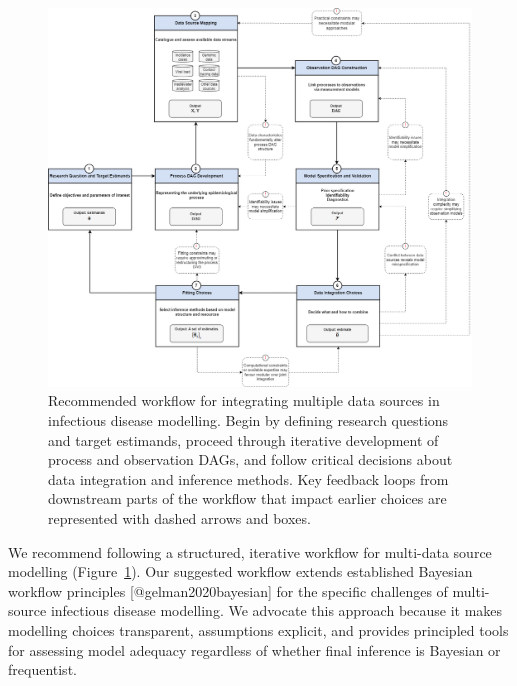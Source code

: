 \documentclass{article}
\begin{document}
\begin{figure}[htbp]
    \centering
    \includegraphics[width=\textwidth]{figures/visualization of core steps.drawio.png}
    \caption{Recommended workflow for integrating multiple data sources in infectious disease modelling. Begin by defining research questions and target estimands, proceed through iterative development of process and observation DAGs, and follow critical decisions about data integration and inference methods. Key feedback loops from downstream parts of the workflow that impact earlier choices are represented with dashed arrows and boxes.}
    \label{fig:workflow}
\end{figure}

We recommend following a structured, iterative workflow for multi-data source modelling (Figure~\ref{fig:workflow}). Our suggested workflow extends established Bayesian workflow principles [@gelman2020bayesian] for  the specific challenges of multi-source infectious disease modelling.
We advocate this approach because it makes modelling choices transparent, assumptions explicit, and provides principled tools for assessing model adequacy regardless of whether final inference is Bayesian or frequentist.
\end{document}
